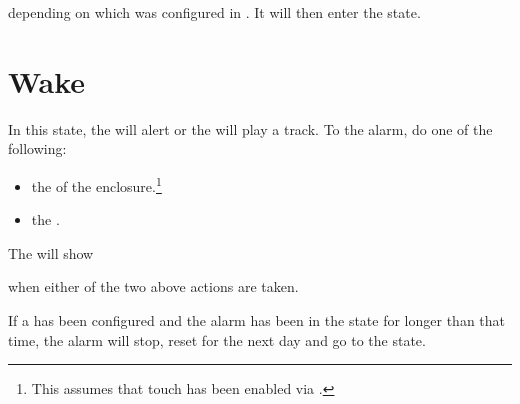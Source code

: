 depending on which was configured in . It will then enter the 
state.



\section{Wake} \label{Alarm - Wake} 

In this state, the  will alert or the  will play a track.  To
 the alarm, do one of the following:

\begin{itemize}
  \item {} the  of the enclosure.\footnote{ This assumes that touch
    has been enabled via \hyperref[Touch Settings]{}.}
  \item {} the .
\end{itemize}


The  will show

\begin{figure}[H]
\centering
\end{figure}

when either of the two above actions are taken.

\par\medskip

If a  has been configured and the alarm has been in the 
state for longer than that time, the alarm will stop, reset for the next day
and go to the  state.


